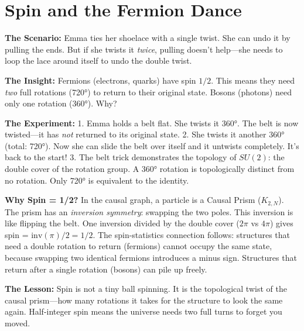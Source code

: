 \documentclass[11pt, a4paper, openany]{book}
\begin{document}
\section{Spin and the Fermion Dance}
\begin{thoughtexp}
\textbf{The Scenario:} Emma ties her shoelace with a single twist. She can undo it by pulling the ends. But if she twists it \emph{twice}, pulling doesn't help---she needs to loop the lace around itself to undo the double twist.

\textbf{The Insight:} Fermions (electrons, quarks) have spin $1/2$. This means they need \emph{two} full rotations (720°) to return to their original state. Bosons (photons) need only one rotation (360°). Why?

\textbf{The Experiment:}
1. Emma holds a belt flat. She twists it 360°. The belt is now twisted---it has \emph{not} returned to its original state.
2. She twists it another 360° (total: 720°). Now she can slide the belt over itself and it untwists completely. It's back to the start!
3. The belt trick demonstrates the topology of $SU(2)$: the double cover of the rotation group. A 360° rotation is topologically distinct from no rotation. Only 720° is equivalent to the identity.

\textbf{Why Spin = 1/2?} In the causal graph, a particle is a Causal Prism ($K_{2,N}$). The prism has an \emph{inversion symmetry}: swapping the two poles. This inversion is like flipping the belt. One inversion divided by the double cover ($2\pi$ vs $4\pi$) gives spin = $\text{inv}(\pi)/2 = 1/2$. The spin-statistics connection follows: structures that need a double rotation to return (fermions) cannot occupy the same state, because swapping two identical fermions introduces a minus sign. Structures that return after a single rotation (bosons) can pile up freely.

\textbf{The Lesson:} Spin is not a tiny ball spinning. It is the topological twist of the causal prism---how many rotations it takes for the structure to look the same again. Half-integer spin means the universe needs two full turns to forget you moved.
\end{thoughtexp}
\end{document}
